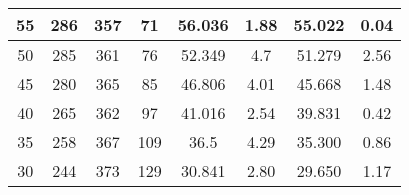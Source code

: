 \begin{landscape}
\begin{table}[]
\begin{tabular}{|c|c|c|c|c|c|c|c|}
55                                                                        & 286                                                           & 357                                                            & 71                                                             & 56.036                                                              & 1.88                  & 55.022           & 0.04                  \\ \hline
50                                                                        & 285                                                           & 361                                                            & 76                                                             & 52.349                                                              & 4.7                   & 51.279           & 2.56                  \\ \hline
45                                                                        & 280                                                           & 365                                                            & 85                                                             & 46.806                                                              & 4.01                  & 45.668           & 1.48                  \\ \hline
40                                                                        & 265                                                           & 362                                                            & 97                                                             & 41.016                                                              & 2.54                  & 39.831           & 0.42                  \\ \hline
35                                                                        & 258                                                           & 367                                                            & 109                                                            & 36.5                                                                & 4.29                  & 35.300           & 0.86                  \\ \hline
30                                                                        & 244                                                           & 373                                                            & 129                                                            & 30.841                                                              & 2.80                  & 29.650           & 1.17                  \\ \hline

\end{tabular}
\end{table}
\end{landscape}
